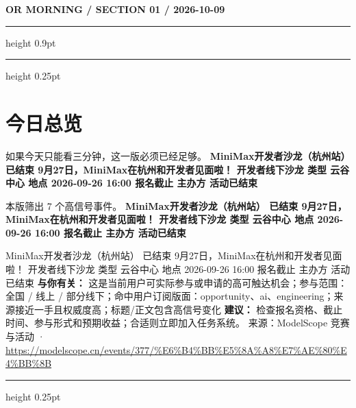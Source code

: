 \documentclass[10.5pt]{ctexart}
\begin{document}
{\small\bfseries OR MORNING / SECTION 01 / 2026-10-09}
\vspace{2mm}
\hrule height 0.9pt
\vspace{1.5mm}
\hrule height 0.25pt
\vspace{4mm}
\section*{今日总览}
{\color{ormuted} 如果今天只能看三分钟，这一版必须已经足够。}
\vspace{2mm}
{\fontsize{25}{29}\selectfont\bfseries MiniMax开发者沙龙（杭州站） 已结束 9月27日，MiniMax在杭州和开发者见面啦！ 开发者线下沙龙 类型 云谷中心 地点 2026-09-26 16:00 报名截止 主办方 活动已结束}\par
\vspace{2mm}
{\large 本版筛出 7 个高信号事件。}
\vspace{3mm}
{\Large\bfseries MiniMax开发者沙龙（杭州站） 已结束 9月27日，MiniMax在杭州和开发者见面啦！ 开发者线下沙龙 类型 云谷中心 地点 2026-09-26 16:00 报名截止 主办方 活动已结束}\par
MiniMax开发者沙龙（杭州站） 已结束 9月27日，MiniMax在杭州和开发者见面啦！ 开发者线下沙龙 类型 云谷中心 地点 2026-09-26 16:00 报名截止 主办方 活动已结束
\textbf{与你有关：} 这是当前用户可实际参与或申请的高可触达机会；参与范围：全国 / 线上 / 部分线下；命中用户订阅版面：opportunity、ai、engineering；来源接近一手且权威度高；标题/正文包含高信号变化
\textbf{建议：} 检查报名资格、截止时间、参与形式和预期收益；合适则立即加入任务系统。
{\footnotesize\color{ormuted} 来源：ModelScope 竞赛与活动 · \url{https://modelscope.cn/events/377/%E6%B4%BB%E5%8A%A8%E7%AE%80%E4%BB%8B}}
\vspace{3mm}
\hrule height 0.25pt
\vspace{3mm}
\end{document}
